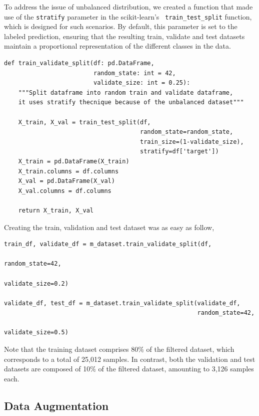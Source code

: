 To address the issue of unbalanced distribution, we created a function that
made use of the {\tt stratify} parameter in the scikit-learn's {\tt
train\_test\_split} function, which is designed for such scenarios. By default,
this parameter is set to the labeled prediction, ensuring that the resulting
train, validate and test datasets maintain a proportional representation of the
different classes in the data.

\begin{Verbatim}[fontsize=\scriptsize]
def train_validate_split(df: pd.DataFrame,
                         random_state: int = 42,
                         validate_size: int = 0.25):
    """Split dataframe into random train and validate dataframe,
    it uses stratify thecnique because of the unbalanced dataset"""

    X_train, X_val = train_test_split(df,
                                      random_state=random_state,
                                      train_size=(1-validate_size),
                                      stratify=df['target'])
    X_train = pd.DataFrame(X_train)
    X_train.columns = df.columns
    X_val = pd.DataFrame(X_val)
    X_val.columns = df.columns

    return X_train, X_val
\end{Verbatim}

Creating the train, validation and test dataset was as easy as follow,

\begin{Verbatim}[fontsize=\scriptsize]
train_df, validate_df = m_dataset.train_validate_split(df,
                                                       random_state=42,
                                                       validate_size=0.2)

validate_df, test_df = m_dataset.train_validate_split(validate_df,
                                                      random_state=42,
                                                      validate_size=0.5)
\end{Verbatim}

Note that the training dataset comprises 80\% of the filtered dataset, which
corresponds to a total of 25,012 samples. In contrast, both the validation and
test datasets are composed of 10\% of the filtered dataset, amounting to 3,126
samples each.

\subsection{Data Augmentation}

